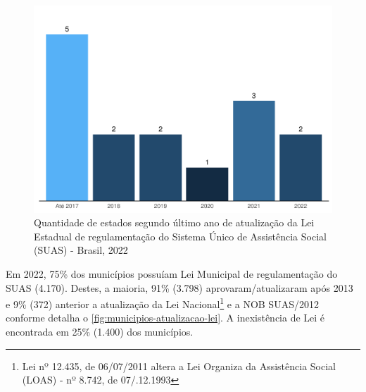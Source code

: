 \documentclass[
  brazilian]{report}
\begin{document}
\begin{figure}
\includegraphics{Censo-SUAS-2022_files/figure-latex/estados-atualizacao-lei-1} \caption[Quantidade de estados segundo último ano de atualização da Lei Estadual de regulamentação do Sistema Único de Assistência Social (SUAS) - Brasil, 2022]{Quantidade de estados segundo último ano de atualização da Lei Estadual de regulamentação do Sistema Único de Assistência Social (SUAS) - Brasil, 2022}\label{fig:estados-atualizacao-lei}
\end{figure}

Em 2022, 75\% dos municípios possuíam Lei Municipal de regulamentação do
SUAS (4.170). Destes, a maioria, 91\% (3.798) aprovaram/atualizaram após
2013 e 9\% (372) anterior a atualização da Lei
Nacional\footnote{Lei nº 12.435, de 06/07/2011 altera a Lei Organiza da Assistência Social (LOAS) - nº 8.742, de 07/.12.1993}
e a NOB SUAS/2012 conforme detalha o
\cref{fig:municipios-atualizacao-lei}. A inexistência de Lei é
encontrada em 25\% (1.400) dos municípios.
\end{document}

